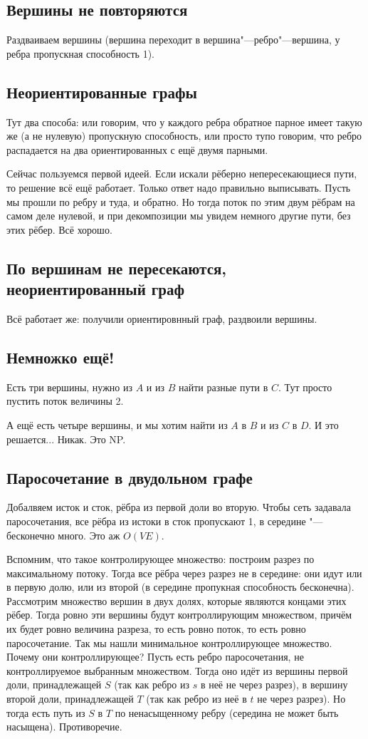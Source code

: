 \subsection{Вершины не повторяются}
Раздваиваем вершины (вершина переходит в вершина"---ребро"---вершина, у ребра пропускная способность 1).

\subsection{Неориентированные графы}
Тут два способа: или говорим, что у каждого ребра обратное парное имеет такую же (а не нулевую) пропускную способность,
или просто тупо говорим, что ребро распадается на два ориентированных с ещё двумя парными.

Сейчас пользуемся первой идеей.
Если искали рёберно непересекающиеся пути, то решение всё ещё работает.
Только ответ надо правильно выписывать.
Пусть мы прошли по ребру и туда, и обратно.
Но тогда поток по этим двум рёбрам на самом деле нулевой, и при декомпозиции мы увидем немного другие пути, без этих рёбер.
Всё хорошо.

\subsection{По вершинам не пересекаются, неориентированный граф}
Всё работает же: получили ориентировнный граф, раздвоили вершины.

\subsection{Немножко ещё!}
Есть три вершины, нужно из $A$ и из $B$ найти разные пути в $C$. Тут просто пустить поток величины 2.

А ещё есть четыре вершины, и мы хотим найти из $A$ в $B$ и из $C$ в $D$.
И это решается... Никак. Это NP.

\subsection{Паросочетание в двудольном графе}
Добалвяем исток и сток, рёбра из первой доли во вторую.
Чтобы сеть задавала паросочетания, все рёбра из истоки в сток пропускают 1, в середине "--- бесконечно много.
Это аж $O(VE)$.

Вспомним, что такое контролирующее множество: построим разрез по максимальному потоку.
Тогда все рёбра через разрез не в середине: они идут или в первую долю, или из второй (в середине пропукная способность бесконечна).
Рассмотрим множество вершин в двух долях, которые являются концами этих рёбер.
Тогда ровно эти вершины будут контроллирующим множеством, причём их будет ровно величина разреза, то есть ровно поток, то есть ровно паросочетание.
Так мы нашли минимальное контроллирующее множество.
Почему они контроллирующее?
Пусть есть ребро паросочетания, не контроллируемое выбранным множеством.
Тогда оно идёт из вершины первой доли, принадлежащей $S$ (так как ребро из $s$ в неё не через разрез), в вершину второй доли, принадлежащей $T$ (так как ребро из неё в $t$ не через разрез).
Но тогда есть путь из $S$ в $T$ по ненасыщенному ребру (середина не может быть насыщена). Противоречие.

